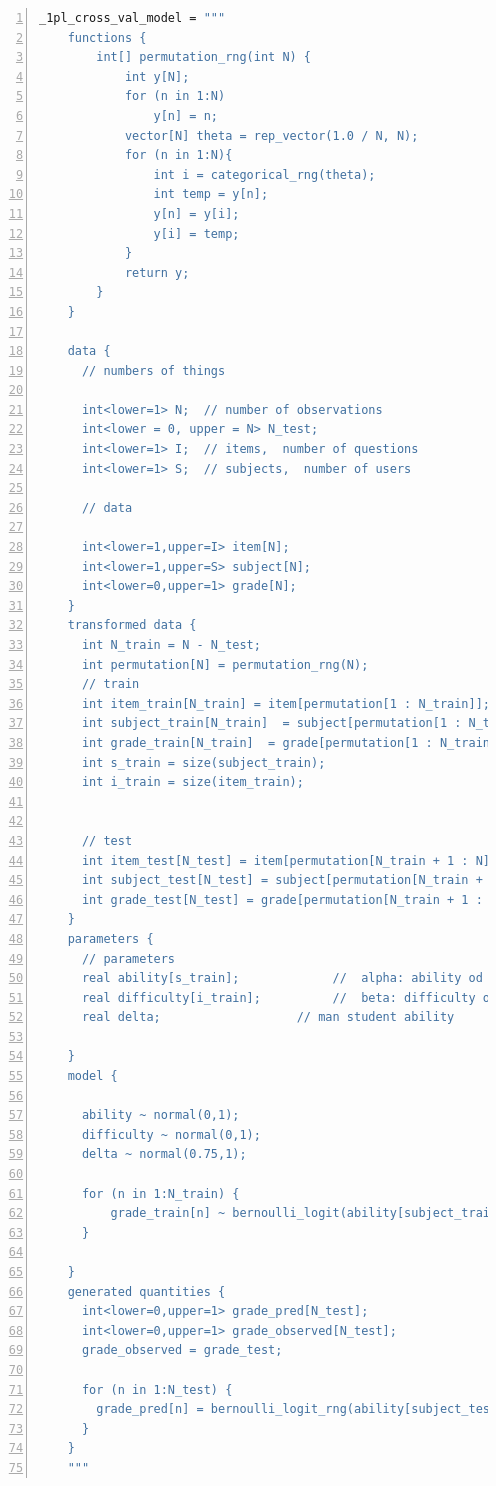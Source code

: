 \begin{lstlisting}[language=Stan,caption={Code Stan pour le modèle de Rasch avec cross-validation},basicstyle=\scriptsize, frame=lines,framesep=4.5mm,framexleftmargin=2.5mm,tabsize=2,numbers=left,fillcolor=\color{white},rulecolor=\color{black},numberstyle=\normalfont\scriptsize\color{black}]
    _1pl_cross_val_model = """
    functions {
        int[] permutation_rng(int N) {
            int y[N];
            for (n in 1:N)
                y[n] = n;
            vector[N] theta = rep_vector(1.0 / N, N);
            for (n in 1:N){
                int i = categorical_rng(theta);
                int temp = y[n];
                y[n] = y[i];
                y[i] = temp;
            }
            return y;
        }
    }
    
    data {
      // numbers of things
      
      int<lower=1> N;  // number of observations
      int<lower = 0, upper = N> N_test;
      int<lower=1> I;  // items,  number of questions  
      int<lower=1> S;  // subjects,  number of users
      
      // data
      
      int<lower=1,upper=I> item[N];
      int<lower=1,upper=S> subject[N];
      int<lower=0,upper=1> grade[N];
    }
    transformed data {
      int N_train = N - N_test;
      int permutation[N] = permutation_rng(N);
      // train
      int item_train[N_train] = item[permutation[1 : N_train]];
      int subject_train[N_train]  = subject[permutation[1 : N_train]];
      int grade_train[N_train]  = grade[permutation[1 : N_train]];
      int s_train = size(subject_train);
      int i_train = size(item_train);
      
      
      // test
      int item_test[N_test] = item[permutation[N_train + 1 : N]];
      int subject_test[N_test] = subject[permutation[N_train + 1 : N]];
      int grade_test[N_test] = grade[permutation[N_train + 1 : N]];
    }
    parameters {
      // parameters
      real ability[s_train];             //  alpha: ability od student
      real difficulty[i_train];          //  beta: difficulty of question
      real delta;                   // man student ability
      
    }
    model {
    
      ability ~ normal(0,1);         
      difficulty ~ normal(0,1);   
      delta ~ normal(0.75,1);
      
      for (n in 1:N_train) {
          grade_train[n] ~ bernoulli_logit(ability[subject_train[n]] - difficulty[item_train[n]] + delta);
      }
      
    }
    generated quantities {
      int<lower=0,upper=1> grade_pred[N_test];
      int<lower=0,upper=1> grade_observed[N_test];
      grade_observed = grade_test;
      
      for (n in 1:N_test) {
        grade_pred[n] = bernoulli_logit_rng(ability[subject_test[n]] - difficulty[item_test[n]] + delta);
      }
    }
    """
\end{lstlisting}

